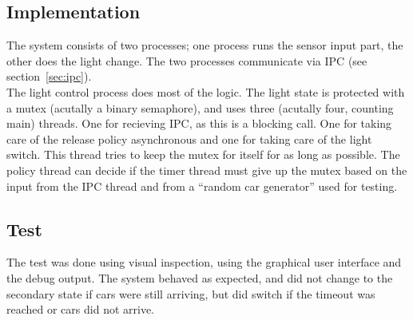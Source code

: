 \subsection{Implementation}
The system consists of two processes; one process runs the sensor input part, the other does the light change. The two processes communicate via IPC (see section~\ref{sec:ipc}).\\
The light control process does most of the logic. The light state is protected with a mutex (acutally a binary semaphore), and uses three (acutally four, counting main) threads. One for recieving IPC, as this is a blocking call. One for taking care of the release policy asynchronous and one for taking care of the light switch. This thread tries to keep the mutex for itself for as long as possible. The policy thread can decide if the timer thread must give up the mutex based on the input from the IPC thread and from a ``random car generator'' used for testing.

\subsection{Test}
The test was done using visual inspection, using the graphical user interface and the debug output. The system behaved as expected, and did not change to the secondary state if cars were still arriving, but did switch if the timeout was reached or cars did not arrive.